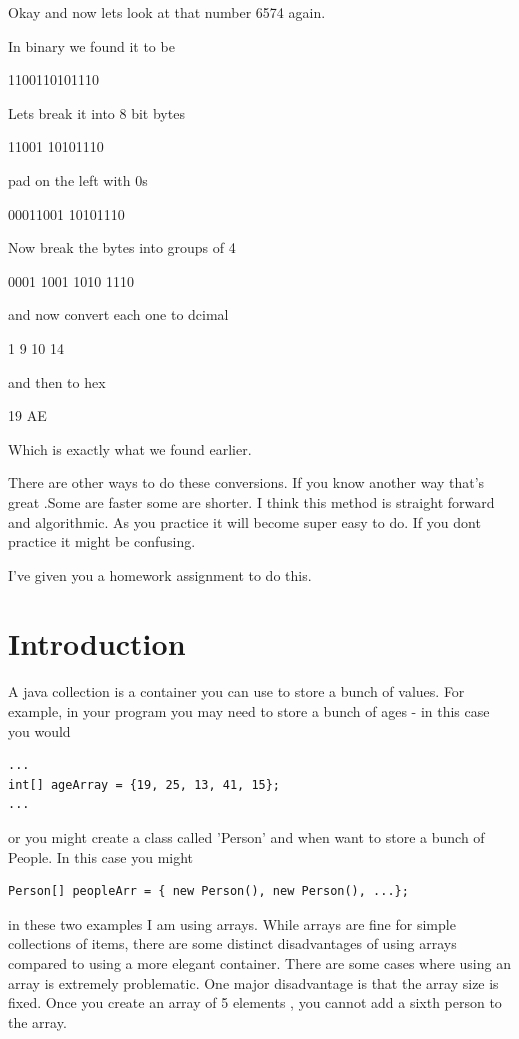 \documentclass[10pt]{article}
\begin{document}
Okay and now lets look at that number 6574 again. 

In binary we found it to be

1100110101110

Lets break it into 8 bit bytes

11001 10101110

pad on the left with 0s

00011001 10101110

Now break the bytes into groups of 4


0001 1001 1010 1110

and now convert each one to dcimal

1    9    10   14

and then to hex

19 AE


Which is exactly what we found earlier. 

There are other ways to do these conversions. If you know another way that's
great .Some are faster some are shorter. I think this method is straight forward
and algorithmic. As you practice it will become super easy to do. If you dont
practice it might be confusing.

I've given you a homework assignment to do this.


\section{Introduction}
A java collection is a container you can use to store a bunch of values. For example, in your program you may need to store a bunch of ages - in this case you would

\begin{lstlisting}[style=java]
...
int[] ageArray = {19, 25, 13, 41, 15};
...
\end{lstlisting} 

or you might create a class called 'Person' and when want to store a bunch of People. In this case you might

\begin{lstlisting}[style=java]
Person[] peopleArr = { new Person(), new Person(), ...};
\end{lstlisting}

in these two examples I am using arrays. While arrays are fine for simple collections of items, there are some distinct disadvantages of using arrays compared to using a more elegant container. There are some cases where using an array is extremely problematic. One major disadvantage is that the array size is fixed. Once you create an array of 5  elements , you cannot add a sixth person to the array.  
\end{document}

